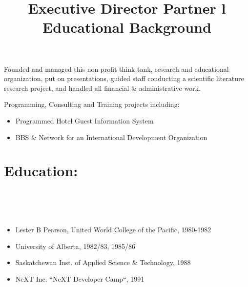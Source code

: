 \begin{resume}
\title{ Executive Director }
\begin{position}
Founded and managed this non-profit think tank, research and educational organization, put on
 presentations, guided staff conducting a scientific literature research project,
and handled all financial \& administrative work.
\end{position}




\title{ Partner }
\begin{position}
Programming, Consulting and Training projects including:
\begin{itemize}
\item Programmed Hotel Guest Information System
\item BBS \& Network for an International Development Organization
\end{itemize}

\end{position}


\section{Education:}

\begin{format}
\title{l}\\
\\
\body\\
\end{format}

\title{ Educational Background }
\begin{itemize}
\item Lester B Pearson, United World College of the Pacific, 1980-1982
\item University of Alberta, 1982/83, 1985/86
\item Saskatchewan Inst. of Applied Science \& Technology, 1988
\item NeXT Inc. ``NeXT Developer Camp``, 1991
\end{itemize}


\end{resume}
